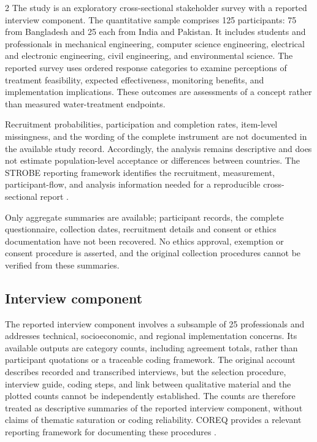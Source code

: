 \documentclass{ieeeaccess}
\begin{document}
\begin{multicols}{2}
The study is an exploratory cross-sectional stakeholder survey with a reported interview component. The quantitative sample comprises 125 participants: 75 from Bangladesh and 25 each from India and Pakistan. It includes students and professionals in mechanical engineering, computer science engineering, electrical and electronic engineering, civil engineering, and environmental science. The reported survey uses ordered response categories to examine perceptions of treatment feasibility, expected effectiveness, monitoring benefits, and implementation implications. These outcomes are assessments of a concept rather than measured water-treatment endpoints.

Recruitment probabilities, participation and completion rates, item-level missingness, and the wording of the complete instrument are not documented in the available study record. Accordingly, the analysis remains descriptive and does not estimate population-level acceptance or differences between countries. The STROBE reporting framework identifies the recruitment, measurement, participant-flow, and analysis information needed for a reproducible cross-sectional report \cite{r15}.

Only aggregate summaries are available; participant records, the complete questionnaire, collection dates, recruitment details and consent or ethics documentation have not been recovered. No ethics approval, exemption or consent procedure is asserted, and the original collection procedures cannot be verified from these summaries.

\subsection{Interview component}

The reported interview component involves a subsample of 25 professionals and addresses technical, socioeconomic, and regional implementation concerns. Its available outputs are category counts, including agreement totals, rather than participant quotations or a traceable coding framework. The original account describes recorded and transcribed interviews, but the selection procedure, interview guide, coding steps, and link between qualitative material and the plotted counts cannot be independently established. The counts are therefore treated as descriptive summaries of the reported interview component, without claims of thematic saturation or coding reliability. COREQ provides a relevant reporting framework for documenting these procedures \cite{r16}.


\end{multicols}
\end{document}
